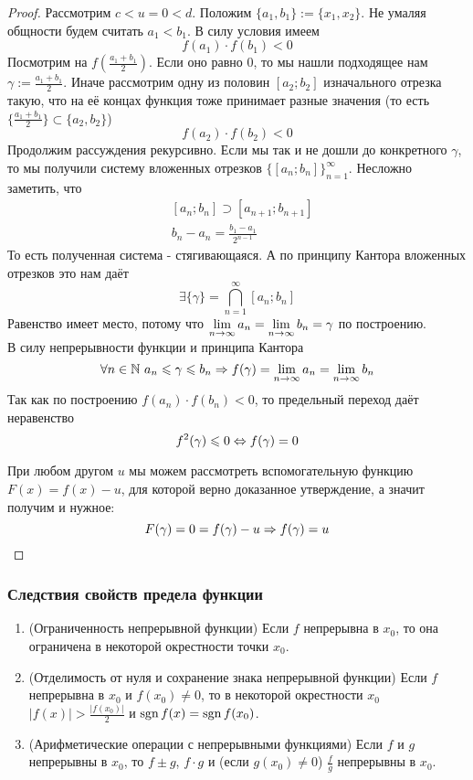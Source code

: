 \begin{proof}
	Рассмотрим $c < u = 0 < d$. Положим $\{a_1, b_1\} := \{x_1, x_2\}$. Не умаляя общности будем считать $a_1 < b_1$. В силу условия имеем
	\[
		f(a_1) \cdot f(b_1) < 0
	\]
	Посмотрим на $f(\frac{a_1 + b_1}{2})$. Если оно равно 0, то мы нашли подходящее нам $\gamma := \frac{a_1 + b_1}{2}$. Иначе рассмотрим одну из половин $[a_2; b_2]$ изначального отрезка такую, что на её концах функция тоже принимает разные значения (то есть \(\{\frac{a_1 + b_1}{2}\} \subset \{a_2, b_2\}\))
	\[
		f(a_2) \cdot f(b_2) < 0
	\]
	Продолжим рассуждения рекурсивно. Если мы так и не дошли до конкретного $\gamma$, то мы получили систему вложенных отрезков $\{[a_n; b_n]\}_{n = 1}^\infty$. Несложно заметить, что
	\begin{align*}
		&{[a_n; b_n] \supset [a_{n + 1}; b_{n + 1}]}
		\\
		&{b_n - a_n = \frac{b_1 - a_1}{2^{n - 1}}}
	\end{align*}
	То есть полученная система - стягивающаяся. А по принципу Кантора вложенных отрезков это нам даёт
	\[
		\exists \{\gamma\} = \bigcap\limits_{n = 1}^\infty [a_n; b_n]
	\]
	Равенство имеет место, потому что $\lim\limits_{n \to \infty} a_n = \lim\limits_{n \to \infty} b_n = \gamma$ по построению.\\
	В силу непрерывности функции и принципа Кантора
	\[
		\forall n \in \mathbb{N}\ a_n \leqslant \gamma \leqslant b_n \Rightarrow f(\gamma) = \lim\limits_{n \to \infty} a_n = \lim\limits_{n \to \infty} b_n
	\]
	Так как по построению $f(a_n) \cdot f(b_n) < 0$, то предельный переход даёт неравенство
	\[
		f^2(\gamma) \leqslant 0 \Leftrightarrow f(\gamma) = 0
	\]
	
	При любом другом $u$ мы можем рассмотреть вспомогательную функцию $F(x) = f(x) - u$, для которой верно доказанное утверждение, а значит получим и нужное:
	\[
		F(\gamma) = 0 = f(\gamma) - u \Rightarrow f(\gamma) = u
	\]
\end{proof}

\subsubsection*{Следствия свойств предела функции}

\begin{enumerate}
	\item (Ограниченность непрерывной функции) Если $f$ непрерывна в $x_0$, то она ограничена в некоторой окрестности точки $x_0$.
	
	\item (Отделимость от нуля и сохранение знака непрерывной функции) Если $f$ непрерывна в $x_0$ и $f(x_0) \neq 0$, то в некоторой окрестности $x_0$ $|f(x)| > \frac{|f(x_0)|}{2}$ и $\operatorname{sgn} f(x) = \operatorname{sgn} f(x_0)$.
	
	\item (Арифметические операции с непрерывными функциями) Если $f$ и $g$ непрерывны в $x_0$, то $f \pm g$, $f \cdot g$ и (если $g(x_0) \neq 0$) $\frac{f}{g}$ непрерывны в $x_0$.
\end{enumerate}

